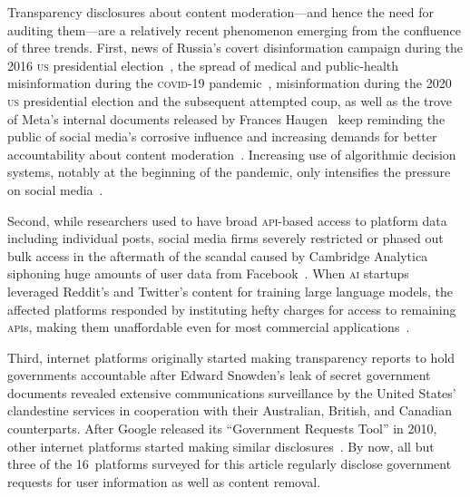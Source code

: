 \documentclass[nonacm,screen]{acmart}
\newcommand\V[1]{\textsc{\MakeLowercase{#1}}}
\begin{document}
Transparency disclosures about content moderation---and hence the need for
auditing them---are a relatively recent phenomenon emerging from the confluence
of three trends. First, news of Russia's covert disinformation campaign during
the 2016 \V{US} presidential election~\cite{Francoisdouek2021}, the spread of
medical and public-health misinformation during the \V{COVID-19}
pandemic~\cite{ChoLiea2023,FoleyGurakar2022,GreenhalghOzbilginea2022},
misinformation during the 2020 \V{US} presidential election and the subsequent
attempted coup, as well as the trove of Meta's internal documents released by
Frances Haugen~\cite{CameronWodinskyea2023,ElliottChristopherea2021} keep
reminding the public of social media's corrosive influence and increasing
demands for better accountability about content
moderation~\cite{HaimsonDelmonacoea2021,KozyrevaHerzogea2023}. Increasing use of
algorithmic decision systems, notably at the beginning of the pandemic, only
intensifies the pressure on social media~\cite{ScottKayali2020}.

Second, while researchers used to have broad \V{API}-based access to platform
data including individual posts, social media firms severely restricted or
phased out bulk access in the aftermath of the scandal caused by Cambridge
Analytica siphoning huge amounts of user data from
Facebook~\cite{Bruns2019,Puschmann2019,WalkerMerceaea2019}. When \V{AI} startups
leveraged Reddit's and Twitter's content for training large language models, the
affected platforms responded by instituting hefty charges for access to
remaining \V{API}s, making them unaffordable even for most commercial
applications~\cite{Isaac2023}.

Third, internet platforms originally started making transparency reports to hold
governments accountable after Edward Snowden's leak of secret government
documents revealed extensive communications surveillance by the United States'
clandestine services in cooperation with their Australian, British, and Canadian
counterparts. After Google released its ``Government Requests Tool'' in 2010,
other internet platforms started making similar
disclosures~\cite{TrustSafetyProfessionalAssociation2022}. By now, all but three
of the 16~platforms surveyed for this article regularly disclose government
requests for user information as well as content removal.
\end{document}

